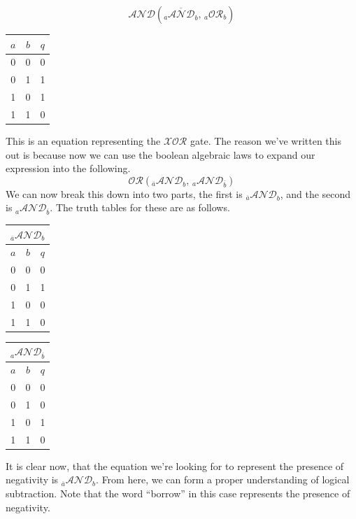 \documentclass[oneside]{book}
\begin{document}
$$
\mathcal{AND}(\overline{_a\mathcal{AND}_b},\, _a\mathcal{OR}_b)
$$
\begin{center}
\begin{tabular}{|c|c|c|}
\hline
$a$ & $b$ & $q$ \\
\hline
0 & 0 & 0 \\
\hline
0 & 1 & 1 \\
\hline
1 & 0 & 1 \\
\hline
1 & 1 & 0 \\
\hline
\end{tabular}
\end{center}
\tab
This is an equation representing the $\mathcal{XOR}$ gate. The reason we've written this out is because now we can use the boolean algebraic laws to expand our expression into the following.
$$
\mathcal{OR}(_{\overline{a}}\mathcal{AND}_b,\,_{a}\mathcal{AND}_{\overline{b}})
$$
\tab
We can now break this down into two parts, the first is $_{\overline{a}}\mathcal{AND}_b$, and the second is $_a\mathcal{AND}_{\overline{b}}$. The truth tables for these are as follows.
\begin{center}
\begin{tabular}{|c|c|c|}
\hline
\multicolumn{3}{|c|}{$_{\overline{a}}\mathcal{AND}_b$} \\
\hline
$a$ & $b$ & $q$ \\
\hline
0 & 0 & 0 \\
\hline
0 & 1 & 1 \\
\hline
1 & 0 & 0 \\
\hline
1 & 1 & 0 \\
\hline
\end{tabular}
\tab
\begin{tabular}{|c|c|c|}
\hline
\multicolumn{3}{|c|}{$_a\mathcal{AND}_{\overline{b}}$} \\
\hline
$a$ & $b$ & $q$ \\
\hline
0 & 0 & 0 \\
\hline
0 & 1 & 0 \\
\hline
1 & 0 & 1 \\
\hline
1 & 1 & 0 \\
\hline
\end{tabular}
\end{center}
\tab
It is clear now, that the equation we're looking for to represent the presence of negativity is $_{\overline{a}}\mathcal{AND}_b$. From here, we can form a proper understanding of logical subtraction. Note that the word ``borrow'' in this case represents the presence of negativity.
\end{document}
